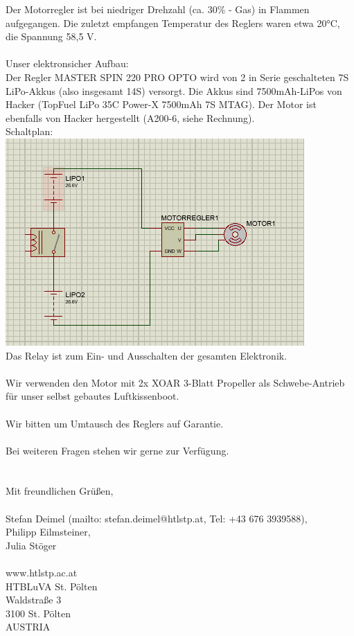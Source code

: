 \documentclass[12pt,a4paper,fleqn,liststotocnumbered,bibtotocnumbered]{scrartcl}
\begin{document}
Der Motorregler ist bei niedriger Drehzahl (ca. 30\% - Gas) in Flammen aufgegangen. Die zuletzt empfangen Temperatur des Reglers waren etwa 20°C, die Spannung 58,5 V.
\\\\

Unser elektronsicher Aufbau:\\
Der Regler MASTER SPIN 220 PRO OPTO wird von 2 in Serie geschalteten 7S LiPo-Akkus (also insgesamt 14S) versorgt. Die Akkus sind 7500mAh-LiPos von Hacker (TopFuel LiPo 35C Power-X 7500mAh 7S MTAG). Der Motor ist ebenfalls von Hacker hergestellt (A200-6, siehe Rechnung).\\
Schaltplan:\\
{\includegraphics[width=.7\textwidth]{2021-02-22-21-04-18.png}}\\
Das Relay ist zum Ein- und Ausschalten der gesamten Elektronik.\\
\\
Wir verwenden den Motor mit 2x XOAR 3-Blatt Propeller als Schwebe-Antrieb für unser selbst gebautes Luftkissenboot.\\
\\
Wir bitten um Umtausch des Reglers auf Garantie.\\\\
Bei weiteren Fragen stehen wir gerne zur Verfügung.\\
\\
\\
Mit freundlichen Grüßen,\\
\\
Stefan Deimel (mailto: stefan.deimel@htlstp.at, Tel: +43 676 3939588),\\
Philipp Eilmsteiner,\\
Julia Stöger\\
\\
www.htlstp.ac.at\\
HTBLuVA St. Pölten\\
Waldstraße 3\\
3100 St. Pölten\\
AUSTRIA
\end{document}
